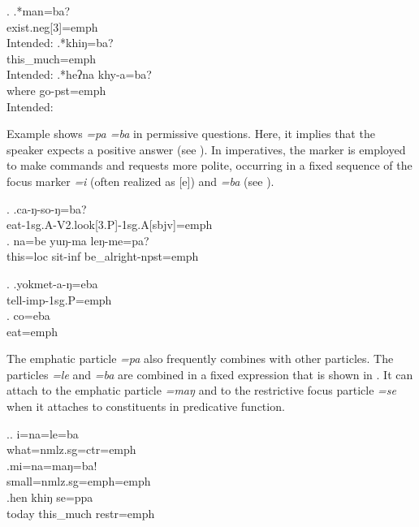   \ex. \ag.*man=ba?\\
  {\sc exist.neg[3]=emph}\\
  Intended: 
  \bg.*khiŋ=ba?\\
  this\_much{\sc =emph}\\
   Intended: 
    \bg.*heʔna khy-a=ba?\\
  where go{\sc [3sg]-pst=emph}\\
   Intended: 
  
  
Example \Next shows \emph{=pa \ti =ba} in permissive questions. Here, it implies that the speaker expects a positive answer (see \Next).  In imperatives, the marker is employed to make commands and requests more polite, occurring in a fixed sequence of the focus marker \emph{=i} (often realized as [e]) and \emph{=ba} (see \NNext).

\ex. \ag.ca-ŋ-so-ŋ=ba?\\
 eat{\sc [3.P]-1sg.A-V2.look[3.P]-1sg.A[sbjv]=emph}\\
  
\bg. na=be yuŋ-ma leŋ-me=pa? \\
this{\sc =loc} sit{\sc -inf} be\_alright{\sc [3sg]-npst=emph}\\

 \ex. \ag.yokmet-a-ŋ=eba \\
 tell{\sc -imp-1sg.P=emph}\\
 \bg.  co=eba\\
 eat{\sc [imp]=emph}\\
 
 The emphatic particle  \emph{=pa} also frequently combines with other particles. The particles \emph{=le} and \emph{=ba} are combined in a fixed expression that is shown in \Next[a]. It can attach to the emphatic particle \emph{=maŋ} and to the restrictive focus particle \emph{=se} when it attaches to constituents in predicative function.
 
 \ex.\ag. i=na=le=ba\\
 	what{\sc =nmlz.sg=ctr=emph}\\ 
 \bg.mi=na=maŋ=ba!\\
small{\sc =nmlz.sg=emph=emph}\\
  
 \bg.hen khiŋ se=ppa\\
 today this\_much {\sc restr=emph}\\
 
